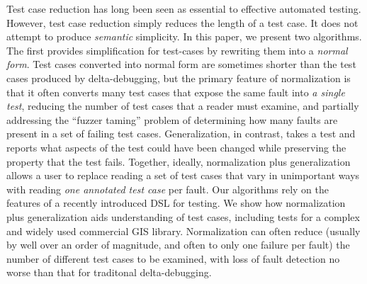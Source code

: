 Test case reduction has long been seen as essential to effective automated testing.  However, test case reduction simply reduces the length of a test case.  It does not attempt to produce \emph{semantic} simplicity.  In this paper, we present two algorithms.  The first provides simplification for test-cases by rewriting them into a \emph{normal form}.  Test cases converted into normal form are sometimes shorter than the test cases produced by delta-debugging, but the primary feature of normalization is that it often converts many test cases that expose the same fault into \emph{a single test}, reducing the number of test cases that a reader must examine, and partially addressing the ``fuzzer taming'' problem of determining how many faults are present in a set of failing test cases.  Generalization, in contrast, takes a test and reports what aspects of the test could have been changed while preserving the property that the test fails.  Together, ideally, normalization plus generalization allows a user to replace reading a set of test cases that vary in unimportant ways with reading \emph{one annotated test case} per fault.  Our algorithms rely on the features of a recently introduced DSL for testing.   We show how normalization plus generalization aids understanding of test cases, including tests for a complex and widely used commercial GIS library.  Normalization can often reduce (usually by well over an order of magnitude, and often to only one failure per fault) the number of different test cases to be examined, with loss of fault detection no worse than that for traditonal delta-debugging.